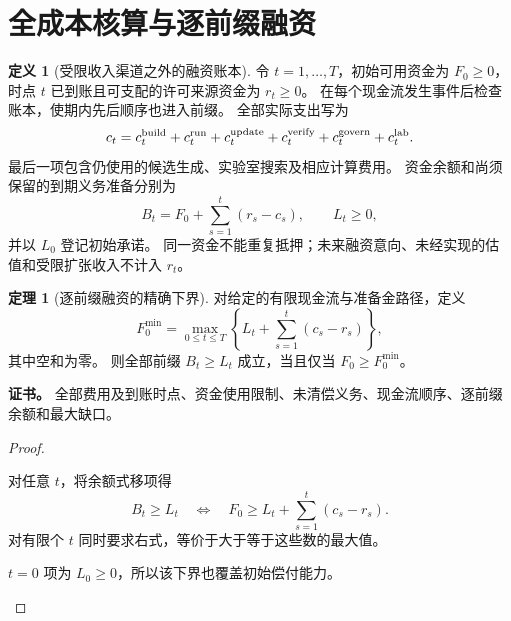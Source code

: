 \documentclass[UTF8,12pt,a4paper,openany,fontset=none,zihao=false]{ctexrep}
\theoremstyle{definition}
\newtheorem{definition}{定义}[chapter]
\newtheorem{theorem}{定理}[chapter]
\newenvironment{certificate}{\par\noindent\textbf{证书。}\ignorespaces}{\par}
\newcommand{\1}{\mathbf 1}
\begin{document}
\section{全成本核算与逐前缀融资}

\begin{definition}[受限收入渠道之外的融资账本]
\label{tra:finance}
令 \(t=1,\ldots,T\)，初始可用资金为 \(F_0\ge0\)，时点 \(t\) 已到账且可支配的许可来源资金为 \(r_t\ge0\)。
在每个现金流发生事件后检查账本，使期内先后顺序也进入前缀。
全部实际支出写为
\[
c_t=c_t^{\rm build}+c_t^{\rm run}+c_t^{\rm update}
     +c_t^{\rm verify}+c_t^{\rm govern}+c_t^{\rm lab}.
\]
最后一项包含仍使用的候选生成、实验室搜索及相应计算费用。
资金余额和尚须保留的到期义务准备分别为
\[
B_t=F_0+\sum_{s=1}^t(r_s-c_s),\qquad L_t\ge0,
\]
并以 \(L_0\) 登记初始承诺。
同一资金不能重复抵押；未来融资意向、未经实现的估值和受限扩张收入不计入 \(r_t\)。
\end{definition}

\begin{theorem}[逐前缀融资的精确下界]
\label{tra:prefix-finance}
对给定的有限现金流与准备金路径，定义
\[
F_0^{\min}=\max_{0\le t\le T}
\left\{L_t+\sum_{s=1}^t(c_s-r_s)\right\},
\]
其中空和为零。
则全部前缀 \(B_t\ge L_t\) 成立，当且仅当 \(F_0\ge F_0^{\min}\)。
\end{theorem}
\begin{certificate}
全部费用及到账时点、资金使用限制、未清偿义务、现金流顺序、逐前缀余额和最大缺口。
\end{certificate}
\begin{proof}
\begin{semanticsteps}
\item 对任意 \(t\)，将余额式移项得
\[
B_t\ge L_t
\quad\Longleftrightarrow\quad
F_0\ge L_t+\sum_{s=1}^t(c_s-r_s).
\]
对有限个 \(t\) 同时要求右式，等价于大于等于这些数的最大值。
\item \(t=0\) 项为 \(L_0\ge0\)，所以该下界也覆盖初始偿付能力。
\end{semanticsteps}
\end{proof}
\end{document}
